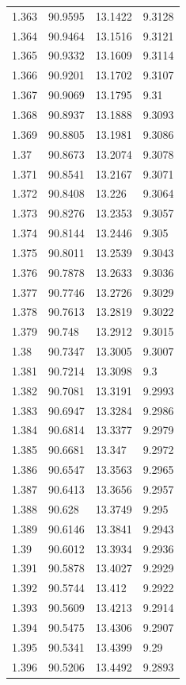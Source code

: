 \begin{tabular}{llll}
1.363 & 90.9595 & 13.1422 & 9.3128 \\
1.364 & 90.9464 & 13.1516 & 9.3121 \\
1.365 & 90.9332 & 13.1609 & 9.3114 \\
1.366 & 90.9201 & 13.1702 & 9.3107 \\
1.367 & 90.9069 & 13.1795 & 9.31 \\
1.368 & 90.8937 & 13.1888 & 9.3093 \\
1.369 & 90.8805 & 13.1981 & 9.3086 \\
1.37 & 90.8673 & 13.2074 & 9.3078 \\
1.371 & 90.8541 & 13.2167 & 9.3071 \\
1.372 & 90.8408 & 13.226 & 9.3064 \\
1.373 & 90.8276 & 13.2353 & 9.3057 \\
1.374 & 90.8144 & 13.2446 & 9.305 \\
1.375 & 90.8011 & 13.2539 & 9.3043 \\
1.376 & 90.7878 & 13.2633 & 9.3036 \\
1.377 & 90.7746 & 13.2726 & 9.3029 \\
1.378 & 90.7613 & 13.2819 & 9.3022 \\
1.379 & 90.748 & 13.2912 & 9.3015 \\
1.38 & 90.7347 & 13.3005 & 9.3007 \\
1.381 & 90.7214 & 13.3098 & 9.3 \\
1.382 & 90.7081 & 13.3191 & 9.2993 \\
1.383 & 90.6947 & 13.3284 & 9.2986 \\
1.384 & 90.6814 & 13.3377 & 9.2979 \\
1.385 & 90.6681 & 13.347 & 9.2972 \\
1.386 & 90.6547 & 13.3563 & 9.2965 \\
1.387 & 90.6413 & 13.3656 & 9.2957 \\
1.388 & 90.628 & 13.3749 & 9.295 \\
1.389 & 90.6146 & 13.3841 & 9.2943 \\
1.39 & 90.6012 & 13.3934 & 9.2936 \\
1.391 & 90.5878 & 13.4027 & 9.2929 \\
1.392 & 90.5744 & 13.412 & 9.2922 \\
1.393 & 90.5609 & 13.4213 & 9.2914 \\
1.394 & 90.5475 & 13.4306 & 9.2907 \\
1.395 & 90.5341 & 13.4399 & 9.29 \\
1.396 & 90.5206 & 13.4492 & 9.2893 \\

\end{tabular}
